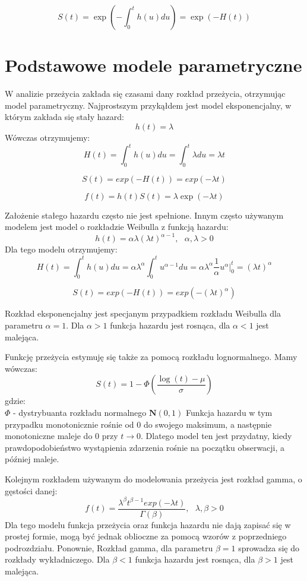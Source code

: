 \documentclass[]{pracamgr}
\begin{document}
\begin{equation}
S(t) = \exp(-\int_0^t h(u)du) = \exp(-H(t))
\end{equation}

\section{Podstawowe modele parametryczne}
W analizie przeżycia zakłada się czasami dany rozkład przeżycia, otrzymując model parametryczny. Najprostszym przykąłdem jest model eksponencjalny, w którym zakłada się stały hazard:
\begin{equation}\label{exp_hazard}
h(t) = \lambda
\end{equation}
Wówczas otrzymujemy:
$$H(t) = \int_0^t h(u)du = \int_0^t \lambda du = \lambda t $$

$$S(t) = exp(-H(t)) = exp(-\lambda t)$$

$$f(t) = h(t)S(t) = \lambda \exp(-\lambda t) $$

Założenie stałego hazardu często nie jest spełnione. Innym często używanym modelem jest model o rozkładzie Weibulla z funkcją hazardu:
\begin{equation}\label{weibull_haz}
h(t) = \alpha \lambda (\lambda t)^{\alpha -1}, \ \ \ \alpha, \lambda > 0
\end{equation}
Dla tego modelu otrzymujemy:
$$H(t) = \int_0^t h(u)du = \alpha \lambda^\alpha \int_0^t u^{\alpha - 1}du = \alpha \lambda^\alpha \frac{1}{\alpha} u^{\alpha}|_0^t = (\lambda t)^\alpha $$

$$S(t) = exp(-H(t)) = exp(-(\lambda t)^\alpha)$$

Rozkład eksponencjalny jest specjanym przypadkiem rozkładu Weibulla dla parametru $\alpha=1$. Dla $\alpha >1$ funkcja hazardu jest rosnąca, dla $\alpha <1$ jest malejąca.

Funkcję przeżycia estymuję się także za pomocą rozkładu lognormalnego. Mamy wówczas:
\begin{equation}\label{lognorm}
S(t) = 1 - \Phi (\frac{\log(t)-\mu}{\sigma})
\end{equation}
gdzie: \\
$\Phi$ - dystrybuanta rozkładu normalnego $\mathbf{N}(0,1)$
Funkcja hazardu w tym przypadku monotonicznie rośnie od $0$ do swojego maksimum, a następnie monotoniczne maleje do $0$ przy $t \to 0$. Dlatego model ten jest przydatny, kiedy prawdopodobieństwo wystąpienia zdarzenia rośnie na początku obserwacji, a później maleje.

Kolejnym rozkładem używanym do modelowania przeżycia jest rozkład gamma, o gęstości danej:
\begin{equation}\label{gamma}
f(t) = \frac{\lambda^\beta t^{\beta - 1} exp(-\lambda t)}{\Gamma(\beta)}, \ \ \ \lambda, \beta > 0
\end{equation}
Dla tego modelu funkcja przeżycia oraz funkcja hazardu nie dają zapisać się w prostej formie, mogą być jednak oblioczne za pomocą wzorów z poprzedniego podrozdziału. Ponownie, Rozkład gamma, dla parametru $\beta = 1$ sprowadza się do rozkłady wykładniczego. Dla $\beta < 1$ funkcja hazardu jest rosnąca, dla $\beta > 1$ jest malejąca.
\end{document}
